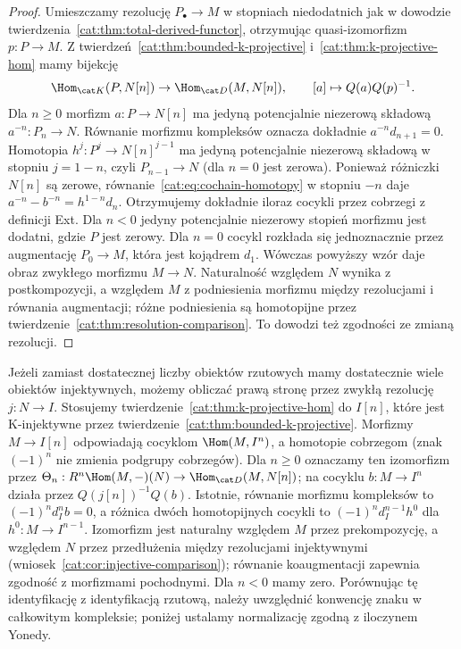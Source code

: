 \begin{proof}
Umieszczamy rezolucję $P_\bullet\to M$ w stopniach niedodatnich jak w dowodzie twierdzenia~\ref{cat:thm:total-derived-functor}, otrzymując quasi-izomorfizm $p:P\to M$. Z twierdzeń~\ref{cat:thm:bounded-k-projective} i~\ref{cat:thm:k-projective-hom} mamy bijekcję
\[
 \Hom_{\cat K}(P,N[n])\to\Hom_{\cat D}(M,N[n]),
 \qquad [a]\mapsto Q(a)Q(p)^{-1}.
\]
Dla $n\ge0$ morfizm $a:P\to N[n]$ ma jedyną potencjalnie niezerową składową $a^{-n}:P_n\to N$. Równanie morfizmu kompleksów oznacza dokładnie $a^{-n}d_{n+1}=0$. Homotopia $h^j:P^j\to N[n]^{j-1}$ ma jedyną potencjalnie niezerową składową w stopniu $j=1-n$, czyli $P_{n-1}\to N$ (dla $n=0$ jest zerowa). Ponieważ różniczki $N[n]$ są zerowe, równanie~\eqref{cat:eq:cochain-homotopy} w stopniu $-n$ daje $a^{-n}-b^{-n}=h^{1-n}d_n$. Otrzymujemy dokładnie iloraz cocykli przez cobrzegi z definicji Ext. Dla $n<0$ jedyny potencjalnie niezerowy stopień morfizmu jest dodatni, gdzie $P$ jest zerowy. Dla $n=0$ cocykl rozkłada się jednoznacznie przez augmentację $P_0\to M$, która jest kojądrem $d_1$. Wówczas powyższy wzór daje obraz zwykłego morfizmu $M\to N$. Naturalność względem $N$ wynika z postkompozycji, a względem $M$ z podniesienia morfizmu między rezolucjami i równania augmentacji; różne podniesienia są homotopijne przez twierdzenie~\ref{cat:thm:resolution-comparison}. To dowodzi też zgodności ze zmianą rezolucji.
\end{proof}
\begin{uwaga}\label{cat:rem:derived-ext-injective}
Jeżeli zamiast dostatecznej liczby obiektów rzutowych mamy dostatecznie wiele obiektów injektywnych, możemy obliczać prawą stronę przez zwykłą rezolucję $j:N\to I$. Stosujemy twierdzenie~\ref{cat:thm:k-projective-hom} do $I[n]$, które jest K-injektywne przez twierdzenie~\ref{cat:thm:bounded-k-projective}. Morfizmy $M\to I[n]$ odpowiadają cocyklom $\Hom(M,I^n)$, a homotopie cobrzegom (znak $(-1)^n$ nie zmienia podgrupy cobrzegów). Dla $n\ge0$ oznaczamy ten izomorfizm przez $\Theta_n:R^n\Hom(M,-)(N)\to\Hom_{\cat D}(M,N[n])$; na cocyklu $b:M\to I^n$ działa przez $Q(j[n])^{-1}Q(b)$. Istotnie, równanie morfizmu kompleksów to $(-1)^n d_I^n b=0$, a różnica dwóch homotopijnych cocykli to $(-1)^n d_I^{n-1}h^0$ dla $h^0:M\to I^{n-1}$. Izomorfizm jest naturalny względem $M$ przez prekompozycję, a względem $N$ przez przedłużenia między rezolucjami injektywnymi (wniosek~\ref{cat:cor:injective-comparison}); równanie koaugmentacji zapewnia zgodność z morfizmami pochodnymi. Dla $n<0$ mamy zero. Porównując tę identyfikację z identyfikacją rzutową, należy uwzględnić konwencję znaku w całkowitym kompleksie; poniżej ustalamy normalizację zgodną z iloczynem Yonedy.
\end{uwaga}
